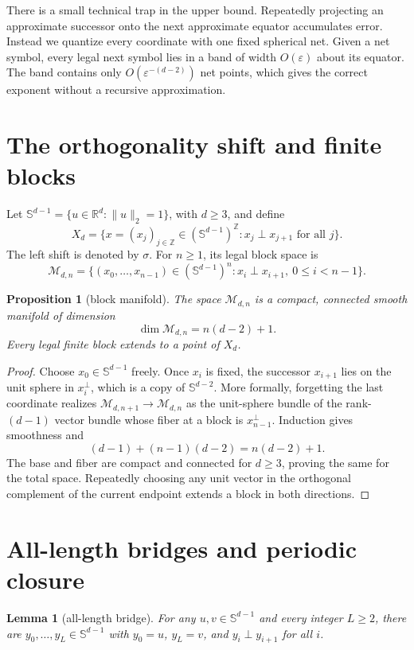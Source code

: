 \documentclass[11pt,a4paper]{amsart}
\newtheorem{proposition}[theorem]{Proposition}
\newtheorem{lemma}[theorem]{Lemma}
\theoremstyle{definition}
\theoremstyle{remark}
\newcommand{\Sphere}{\mathbb S}
\newcommand{\R}{\mathbb R}
\newcommand{\Z}{\mathbb Z}
\begin{document}
There is a small technical trap in the upper bound.  Repeatedly projecting an
approximate successor onto the next approximate equator accumulates error.
Instead we quantize every coordinate with one fixed spherical net.  Given a
net symbol, every legal next symbol lies in a band of width $O(\varepsilon)$
about its equator.  The band contains only $O(\varepsilon^{-(d-2)})$ net
points, which gives the correct exponent without a recursive approximation.

\section{The orthogonality shift and finite blocks}

Let $\Sphere^{d-1}=\{u\in\R^d:\|u\|_2=1\}$, with $d\geq3$, and define
\[
 X_d=\{x=(x_j)_{j\in\Z}\in(\Sphere^{d-1})^{\Z}:
       x_j\perp x_{j+1}\text{ for all }j\}.
\]
The left shift is denoted by $\sigma$.  For $n\geq1$, its legal block space is
\[
 \mathcal M_{d,n}=\{(x_0,\ldots,x_{n-1})\in(\Sphere^{d-1})^n:
          x_i\perp x_{i+1},\ 0\leq i<n-1\}.
\]

\begin{proposition}[block manifold]\label{prop:manifold}
The space $\mathcal M_{d,n}$ is a compact, connected smooth manifold of
dimension
\[
 \dim\mathcal M_{d,n}=n(d-2)+1.
\]
Every legal finite block extends to a point of $X_d$.
\end{proposition}

\begin{proof}
Choose $x_0\in\Sphere^{d-1}$ freely.  Once $x_i$ is fixed, the successor
$x_{i+1}$ lies on the unit sphere in $x_i^\perp$, which is a copy of
$\Sphere^{d-2}$.  More formally, forgetting the last coordinate realizes
$\mathcal M_{d,n+1}\to\mathcal M_{d,n}$ as the unit-sphere bundle of the
rank-$(d-1)$ vector bundle whose fiber at a block is $x_{n-1}^\perp$.
Induction gives smoothness and
\[
 (d-1)+(n-1)(d-2)=n(d-2)+1.
\]
The base and fiber are compact and connected for $d\geq3$, proving the same
for the total space.  Repeatedly choosing any unit vector in the orthogonal
complement of the current endpoint extends a block in both directions.
\end{proof}

\section{All-length bridges and periodic closure}

\begin{lemma}[all-length bridge]\label{lem:bridge}
For any $u,v\in\Sphere^{d-1}$ and every integer $L\geq2$, there are
$y_0,\ldots,y_L\in\Sphere^{d-1}$ with $y_0=u$, $y_L=v$, and
$y_i\perp y_{i+1}$ for all $i$.
\end{lemma}
\end{document}
